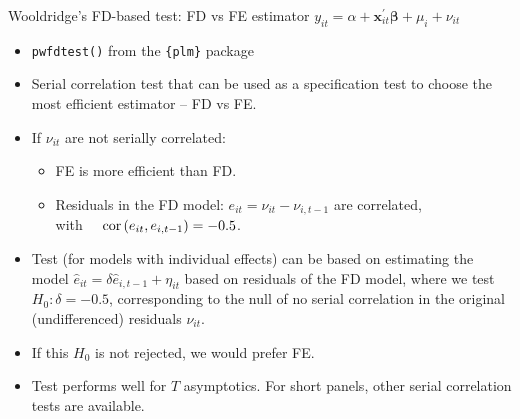 \documentclass{beamer}
\begin{document}
\begin{frame}{Wooldridge's FD-based test: FD vs FE estimator}
$y_{it} = \alpha + \bm{x}^{\prime}_{it} \bm{\beta} + \mu_i + \nu_{it}$\\ \medskip
\begin{itemize}
    \item \texttt{pwfdtest()} from the \texttt{\{plm\}} package
    \smallskip
    \item Serial correlation test that can be used as a specification test to choose the most efficient estimator -- FD vs FE.
    \item If $\nu_{it}$ are not serially correlated: 
    \begin{itemize}
          \item FE is more efficient than FD.
          \item Residuals in the FD model: $e_{it} = \nu_{it}-\nu_{i,t-1}$ are correlated, \\with~~ $\textnormal{cor}\left(e_{it},e_{i,t-1}\right)=-0.5$.
        \end{itemize}
        \item Test (for models with individual effects) can be based on estimating the model $\hat{e}_{it}=\delta \hat{e}_{i,t-1}+\eta_{it}$ based on residuals of the FD model, where we test $H_0: \delta=-0.5$, corresponding to the null of no serial correlation in the original (undifferenced) residuals $\nu_{it}$. 
        \item If this $H_0$ is not rejected, we would prefer FE.
        \medskip
    \item Test performs well for $T$ asymptotics. For short panels, other serial correlation tests are available.
\end{itemize}
\end{frame}
\end{document}
